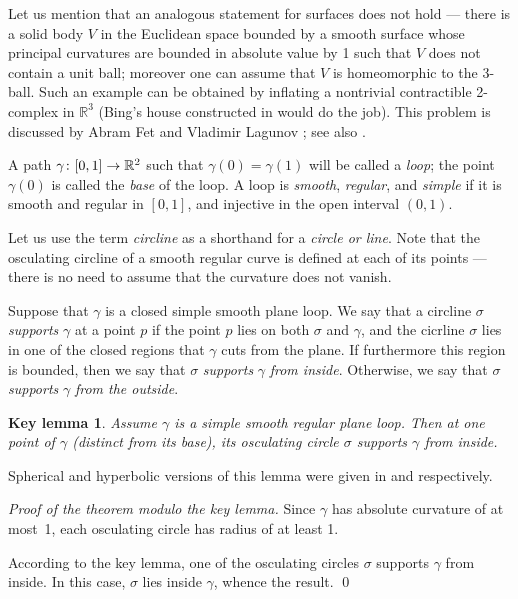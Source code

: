 \documentclass{article}
\newcommand*{\z}[1]{#1\nobreak\discretionary{}%
            {\hbox{$\mathsurround=0pt #1$}}{}}
\theoremstyle{theorem}
\newtheorem*{keylemma}{Key lemma}
\theoremstyle{definition}
\begin{document}
Let us mention that an analogous statement for surfaces does not hold --- there is a solid body $V$ in the Euclidean space bounded by a smooth surface whose principal curvatures are bounded in absolute value by 1 such that $V$ does not contain a unit ball; moreover one can assume that $V$ is homeomorphic to the 3-ball.
Such an example can be obtained by inflating a nontrivial contractible 2-complex in $\mathbb{R}^3$ 
(Bing's house constructed in \cite{bing} would do the job).
This problem is discussed by Abram Fet and Vladimir Lagunov \cite{lagunov-2,lagunov-fet}; see also \cite{petrunin-zamora}.

\medskip

A path $\gamma\colon [0,1]\z\to \mathbb{R}^2$ such that $\gamma (0) = \gamma (1)$ will be called a \emph{loop};
the point $\gamma (0)$ is called the \emph{base} of the loop.
A loop is \emph{smooth}, \emph{regular}, and \emph{simple} if it is smooth and regular in $[0,1]$, and injective in the open interval $(0,1)$.

Let us use the term \emph{circline} as a shorthand for a \emph{circle or line}.
Note that the osculating circline of a smooth regular curve is defined at each of its points --- there is no need to assume that the curvature does not vanish.

Suppose that $\gamma$ is a closed simple smooth plane loop.
We say that a circline $\sigma$ \emph{supports} $\gamma$ at a point $p$ if the point $p$ lies on both $\sigma$ and $\gamma$, and the cicrline $\sigma$ lies in one of the closed regions that $\gamma$ cuts from the plane.
If furthermore this region is bounded, then  we say that $\sigma$ \emph{supports} $\gamma$ \emph{from inside}.
Otherwise, we say that $\sigma$ \emph{supports} $\gamma$ \emph{from the outside}.

\begin{keylemma}\label{thm:moon}
Assume $\gamma$ is a simple smooth regular plane loop.
Then at one point of $\gamma$ (distinct from its base), its osculating circle $\sigma$ supports $\gamma$ from inside.
\end{keylemma}

Spherical and hyperbolic versions of this lemma were given in \cite[Lemma 8.2]{panov-petrunin} and \cite[Proposition 7.1]{alexakis-mazzeo} respectively.

\medskip\noindent\textit{Proof of the theorem modulo the key lemma.}
Since $\gamma$ has absolute curvature of at most~1, each osculating circle has radius of at least 1.

According to the key lemma, one of the osculating circles $\sigma$ supports $\gamma$ from inside.
In this case, $\sigma$ lies inside $\gamma$, whence the result.
\qed
\end{document}
